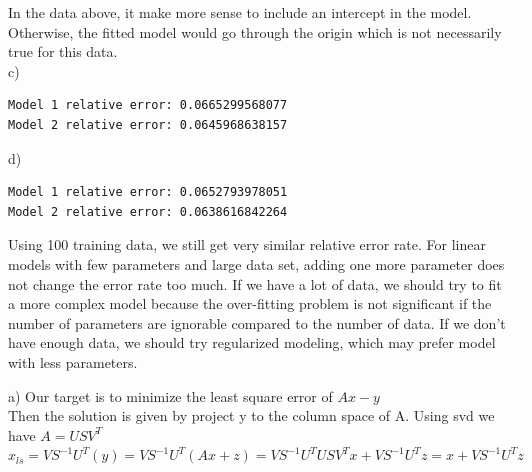 \documentclass[11pt]{article}
\newenvironment{problem}[2][Problem]{\begin{trivlist}
\item[\hskip \labelsep {\bfseries #1}\hskip \labelsep {\bfseries #2.}]}{\end{trivlist}}
\begin{document}
In the data above, it make more sense to include an intercept in the model. Otherwise, the fitted model would go through the origin which is not necessarily true for this data. \\

c)
\begin{verbatim}
Model 1 relative error: 0.0665299568077
Model 2 relative error: 0.0645968638157
\end{verbatim}

d)
\begin{verbatim}
Model 1 relative error: 0.0652793978051
Model 2 relative error: 0.0638616842264
\end{verbatim}
Using 100 training data, we still get very similar relative error rate. For linear models with few  parameters and large data set, adding one more parameter does not change the error rate too much. If we have a lot of data, we should try to fit a more complex model because the over-fitting problem is not significant if the number of parameters are ignorable compared to the number of data. If we don't have enough data, we should try regularized modeling, which may prefer model with less parameters.\\

\begin{problem}{4}
\end{problem}
a) Our target is to minimize the least square error of $Ax-y$\\ Then the solution is given by project y to the column space of A. Using svd we have $A =USV^T$ \\
$x_{ls} = VS^{-1}U^T(y) =VS^{-1}U^T(Ax+z)  = VS^{-1}U^T USV^Tx + VS^{-1}U^Tz = x + VS^{-1}U^Tz$\\
\end{document}
